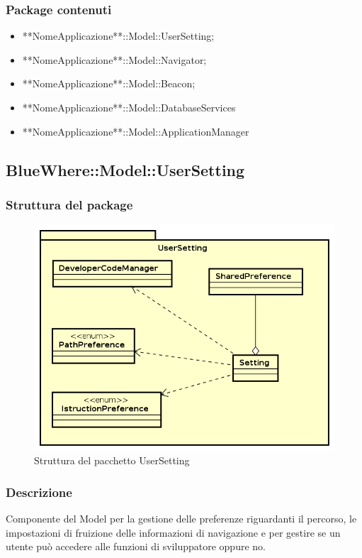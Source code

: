 \documentclass[../SpecificaTecnica.tex]{subfiles}
\begin{document}
		\subsubsection{Package contenuti}
			\begin{itemize}
				\item **NomeApplicazione**::Model::UserSetting;
				\item **NomeApplicazione**::Model::Navigator;
				\item **NomeApplicazione**::Model::Beacon;
				\item **NomeApplicazione**::Model::DatabaseServices
				\item **NomeApplicazione**::Model::ApplicationManager
			\end{itemize}
			\newpage
	\subsection{BlueWhere::Model::UserSetting}
		\subsubsection{Struttura del package}
			\begin{figure}[!h]
				\centering
				\includegraphics[scale=0.6]{diagrammi/UserSetting.png}
					\caption{Struttura del pacchetto UserSetting}
				\label{fig:Struttura_MVP}
			\end{figure} 
		\subsubsection{Descrizione}
			Componente del Model per la gestione delle preferenze riguardanti il percorso, le impostazioni di fruizione delle informazioni di navigazione e per gestire se un utente può accedere alle funzioni di sviluppatore oppure no.
\end{document}
